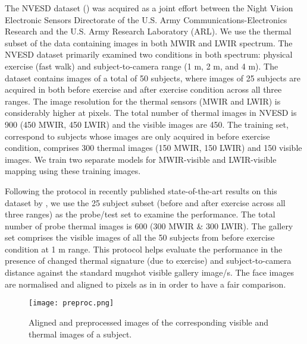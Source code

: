 \documentclass[smallextended,natbib]{svjour3}       \usepackage{graphicx}
\begin{document}
The NVESD dataset (\cite{NVESD}) was acquired as a joint effort between the Night Vision Electronic Sensors Directorate of the U.S. Army Communications-Electronics Research and the U.S. Army Research Laboratory (ARL). We use the thermal subset of the data containing images in both MWIR and LWIR spectrum. The NVESD dataset primarily examined two conditions in both spectrum: physical exercise (fast walk) and subject-to-camera range (1 m, 2 m, and 4 m). The dataset contains images of a total of 50 subjects, where images of 25 subjects are acquired in both before exercise and after exercise condition across all three ranges. The image resolution for the thermal sensors (MWIR and LWIR) is considerably higher at  pixels. The total number of thermal images in NVESD is 900 (450 MWIR, 450 LWIR) and the visible images are 450. The training set,  correspond to subjects whose images are only acquired in before exercise condition,  comprises 300 thermal images (150 MWIR, 150 LWIR) and 150 visible images. We train two separate models for MWIR-visible and LWIR-visible mapping using these training images. 

Following the protocol in recently published state-of-the-art results on this dataset by \cite{hu2015}, we use the 25 subject subset (before and after exercise across all three ranges) as the probe/test set to examine the performance. The total number of probe thermal images is 600 (300 MWIR \& 300 LWIR).
The gallery set comprises the visible images of all the 50 subjects from before exercise condition at 1 m range. This protocol helps evaluate the performance in the presence of changed thermal signature (due to exercise) and subject-to-camera distance against the standard mugshot visible gallery image/s. The face images are normalised and aligned to  pixels as in \cite{hu2015} in order to have a fair comparison.

\begin{figure}
    \texttt{[image: preproc.png]}
    \caption{Aligned and preprocessed images of the corresponding visible and thermal images of a subject.}
    \label{fig:2a}
\end{figure}
\end{document}
